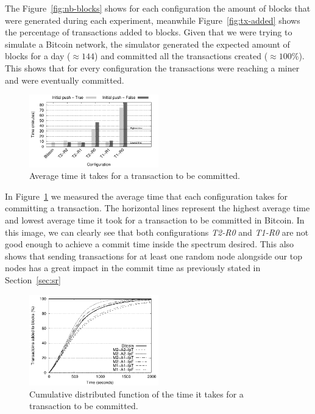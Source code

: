\documentclass{dads}   %
\begin{document}
The Figure~\ref{fig:nb-blocks} shows for each configuration the amount of blocks that were generated during each experiment, meanwhile Figure~\ref{fig:tx-added} shows the percentage of transactions added to blocks. Given that we were trying to simulate a Bitcoin network, the simulator generated the expected amount of blocks for a day ($\approx 144$) and committed all the transactions created ($\approx 100\%$). This shows that for every configuration the transactions were reaching a miner and were eventually committed.

\begin{figure}
\centering
\includegraphics[width=0.5\textwidth]{plots/commit-time.pdf}
\caption{Average time it takes for a transaction to be committed.}
\label{fig:commit-time}
\end{figure}

In Figure~\ref{fig:commit-time} we measured the average time that each configuration takes for committing a transaction. The horizontal lines represent the highest average time and lowest average time it took for a transaction to be committed in Bitcoin. In this image, we can clearly see that both configurations \textsl{T2-R0} and \textsl{T1-R0} are not good enough to achieve a commit time inside the spectrum desired. This also shows that sending transactions for at least one random node alongside our top nodes has a great impact in the commit time as previously stated in Section~\ref{sec:sr}

\begin{figure}
\centering
\includegraphics[width=0.5\textwidth]{plots/cdf_commit.pdf}
\caption{Cumulative distributed function of the time it takes for a transaction to be committed.}
\label{fig:cdf-commit}
\end{figure}
\end{document}
